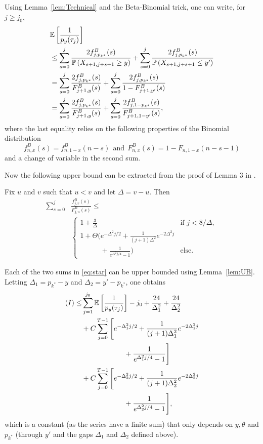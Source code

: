 Using Lemma~\ref{lem:Technical} and the Beta-Binomial trick, one can write, for $j \geq j_0$, 
\begin{align}
\nonumber
&\mathbb{E}\left[\frac{1}{p_y(\tau_{j})}\right]
\\ \nonumber & \leq
\sum_{s=0}^j \frac{2f^B_{j,p_{k^*}}(s)}{\mathbb{P}\left(X_{s+1,j+s+1} \geq y\right)}+\sum_{s=0}^j \frac{2f^B_{j,p_{k^*}}(s)}{\mathbb{P}\left(X_{s+1,j+s+1} \leq y'\right)} 
 \\ \nonumber & =
 \sum_{s=0}^j \frac{2f^B_{j,p_{k^*}}(s)}{F^B_{j+1,y}(s)} + \sum_{s=0}^j \frac{2f^B_{j,p_{k^*}}(s)}{1-F^B_{j+1,y'}(s)}
 \\ & = \sum_{s=0}^j \frac{2f^B_{j,p_{k^*}}(s)}{F^B_{j+1,y}(s)} + \sum_{s=0}^j \frac{2f^B_{j,1-p_{k^*}}(s)}{F^B_{j+1,1-y'}(s)},\label{eq:star}
\end{align}
where the last equality relies on the following properties of the Binomial distribution \[f^B_{n,x}(s) = f^B_{n,1-x}(n-s) \ \ \text{and} \ \ F^B_{n,x}(s) = 1 - F_{n,1-x}(n-s-1)\]
and a change of variable in the second sum. 

Now the following upper bound can be extracted from the proof of Lemma 3 in \cite{AGAISTAT13}. 

\begin{lemma}\label{lem:UB} Fix $u$ and $v$ such that $u < v$ and let $\Delta = v - u$. Then 
\begin{align*}
\sum_{s=0}^j & \frac{f^B_{j,v}(s)}{F^B_{j,u}(s)} \leq
\\ & \left\{\begin{array}{ll}
 1 + \frac{3}{\Delta} & \text{if } j < {8}/\Delta,
 \\
 1 + \Theta\Big(e^{-\Delta^2 j /2}
 + \frac{1}{(j+1)\Delta^2}e^{-2\Delta^2 j} 
 &
  \\
~~~~~~~~~~~~~ + \frac{1}{e^{\Delta^2j/4} - 1}\Big) 
 &  \text{else.} 
\end{array}
\right.
\end{align*}
\end{lemma}

Each of the two sums in \eqref{eq:star} can be upper bounded using Lemma~\ref{lem:UB}. Letting $\Delta_1 = p_{k^*} - y$ and $\Delta_2 = y' - p_{k^*}$, one obtains  
\begin{align*}
 (I) \leq &
 	\sum_{j=1}^{j_0} \mathbb{E}\left[\frac{1}{p_y(\tau_{j})} \right]
 	- j_0 + \frac{24}{\Delta_1^2} + \frac{24}{\Delta_2^2} 
\\ &
	+ C \sum_{j=0}^{T-1} \Bigg[e^{-\Delta_1^2 j /2} + \frac{1}{(j+1)\Delta_1^2}e^{-2\Delta_1^2 j}
\\& ~~~~~~~~~~~~~~~~~~ + \frac{1}{e^{\Delta_1^2j/4} - 1}\Bigg]
\\ &
	+ C \sum_{j=0}^{T-1} \Bigg[e^{-\Delta_2^2 j /2} + \frac{1}{(j+1)\Delta_2^2}e^{-2\Delta_2^2 j}
\\& ~~~~~~~~~~~~~~~~~~	+ \frac{1}{e^{\Delta_2^2j/4} - 1}\Bigg], 
\end{align*}
which is a constant (as the series have a finite sum) that only depends on $y, \theta$ and $p_{k^*}$ (through $y'$ and the gaps $\Delta_1$ and $\Delta_2$ defined above). 

